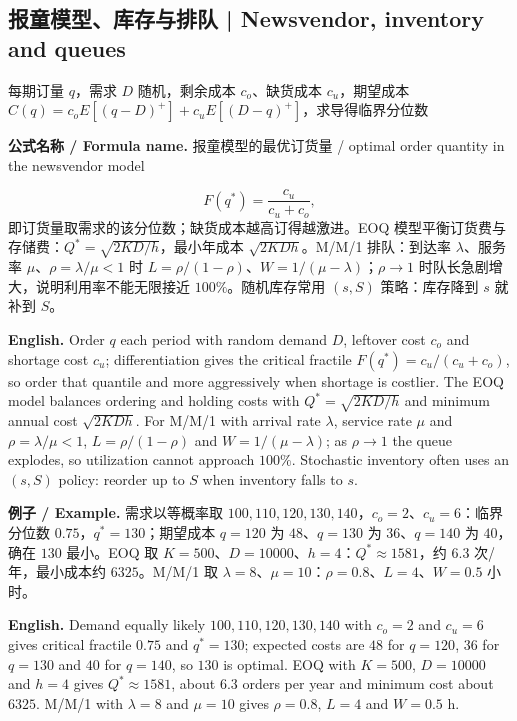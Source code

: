 \documentclass[UTF8,11pt,a4paper]{ctexart}
\newcommand{\EN}[1]{\par\noindent\textbf{English.} #1\par}
\newcommand{\FORMULA}[2]{\par\noindent\textbf{公式名称 / Formula name.} #1 / #2\par}
\newcommand{\EX}[2]{\par\noindent\textbf{例子 / Example.} #1\par\EN{#2}}
\begin{document}
\subsection{报童模型、库存与排队 | Newsvendor, inventory and queues}
每期订量 $q$，需求 $D$ 随机，剩余成本 $c_o$、缺货成本 $c_u$，期望成本 $C(q)=c_oE[(q-D)^+]+c_uE[(D-q)^+]$，求导得临界分位数
\FORMULA{报童模型的最优订货量}{optimal order quantity in the newsvendor model}
\[
F(q^*)=\frac{c_u}{c_u+c_o},
\]
即订货量取需求的该分位数；缺货成本越高订得越激进。EOQ 模型平衡订货费与存储费：$Q^*=\sqrt{2KD/h}$，最小年成本 $\sqrt{2KDh}$。M/M/1 排队：到达率 $\lambda$、服务率 $\mu$、$\rho=\lambda/\mu<1$ 时 $L=\rho/(1-\rho)$、$W=1/(\mu-\lambda)$；$\rho\to1$ 时队长急剧增大，说明利用率不能无限接近 $100\%$。随机库存常用 $(s,S)$ 策略：库存降到 $s$ 就补到 $S$。
\EN{Order $q$ each period with random demand $D$, leftover cost $c_o$ and shortage cost $c_u$; differentiation gives the critical fractile $F(q^*)=c_u/(c_u+c_o)$, so order that quantile and more aggressively when shortage is costlier. The EOQ model balances ordering and holding costs with $Q^*=\sqrt{2KD/h}$ and minimum annual cost $\sqrt{2KDh}$. For M/M/1 with arrival rate $\lambda$, service rate $\mu$ and $\rho=\lambda/\mu<1$, $L=\rho/(1-\rho)$ and $W=1/(\mu-\lambda)$; as $\rho\to1$ the queue explodes, so utilization cannot approach $100\%$. Stochastic inventory often uses an $(s,S)$ policy: reorder up to $S$ when inventory falls to $s$.}
\EX{需求以等概率取 $100,110,120,130,140$，$c_o=2$、$c_u=6$：临界分位数 $0.75$，$q^*=130$；期望成本 $q=120$ 为 $48$、$q=130$ 为 $36$、$q=140$ 为 $40$，确在 $130$ 最小。EOQ 取 $K=500$、$D=10000$、$h=4$：$Q^*\approx1581$，约 $6.3$ 次/年，最小成本约 $6325$。M/M/1 取 $\lambda=8$、$\mu=10$：$\rho=0.8$、$L=4$、$W=0.5$ 小时。}{Demand equally likely $100,110,120,130,140$ with $c_o=2$ and $c_u=6$ gives critical fractile $0.75$ and $q^*=130$; expected costs are $48$ for $q=120$, $36$ for $q=130$ and $40$ for $q=140$, so $130$ is optimal. EOQ with $K=500$, $D=10000$ and $h=4$ gives $Q^*\approx1581$, about $6.3$ orders per year and minimum cost about $6325$. M/M/1 with $\lambda=8$ and $\mu=10$ gives $\rho=0.8$, $L=4$ and $W=0.5$ h.}
\end{document}
